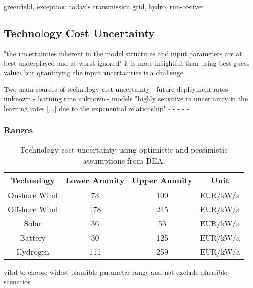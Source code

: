 greenfield, exception: today's transmission grid, hydro, run-of-river


\subsection{Technology Cost Uncertainty}
\label{sec:uncertainty}

"the uncertainties inherent in the model structures and input parameters are at best underplayed and at worst ignored" \cite{yue_review_2018}
it is more insightful than using best-guess values \cite{fraiture_robustness_2020}
but quantifying the input uncertainties is a challenge \cite{moret_characterization_2017}

Two main sources of technology cost uncertainty \cite{trondle_trade-offs_2020}
- future deployment rates unknown
- learning rate unknown
- models "highly sensitive to uncertainty in the learning rates [...] due to the exponential relationship" \cite{mattsson_learning_2019}
- \cite{yeh_review_2012}
- \cite{heuberger_power_2017}
- \cite{gritsevskyi_modeling_2000}
- \cite{schmidt_projecting_2019}
- \cite{schmidt_future_2017}

\subsubsection{Ranges}

\begin{SCtable}
    \begin{small}
        \begin{tabular}{cccc}
            \toprule
            Technology & Lower Annuity & Upper Annuity & Unit  \\ \midrule
            Onshore Wind & 73 & 109 & EUR/kW/a \\
            Offshore Wind & 178 & 245 & EUR/kW/a \\ %
            Solar & 36 & 53 & EUR/kW/a \\
            Battery & 30 & 125 & EUR/kW/a \\
            Hydrogen & 111 & 259 & EUR/kW/a \\ \bottomrule
        \end{tabular}
    \end{small}
    \caption{Technology cost uncertainty using optimistic and pessimistic assumptions from DEA.}
    \label{tab:costuncertainty}
\end{SCtable}   

vital to choose widest plausible parameter range and not exclude plausible scenarios \cite{moret_characterization_2017,mccollum_energy_2020}

